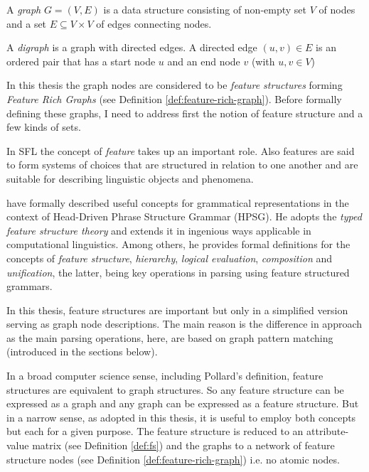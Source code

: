 \begin{definition}[Graph]\label{def:graph}
	A \textit{graph} $G=(V,E)$ is a data structure consisting of non-empty set $V$ of nodes and a set $E\subseteq V \times V$ of edges connecting nodes.
\end{definition}

\begin{definition}[Digraph]\label{def:digraph}
	A \textit{digraph} is a graph with directed edges. A directed edge $(u,v)\in E$ is an ordered pair that has a start node $u$ and an end node $v$ (with $u, v \in V$)
\end{definition}


In this thesis the graph nodes are considered to be \textit{feature structures} forming \textit{Feature Rich Graphs} (see Definition \ref{def:feature-rich-graph}). Before formally defining these graphs, I need to address first the notion of feature structure and a few kinds of sets. 

In SFL the concept of \textit{feature} takes up an important role. Also features are said to form systems of choices that are structured in relation to one another and are suitable for describing linguistic objects and phenomena.

\citet{Pollard1987} have formally described useful concepts for grammatical representations in the context of Head-Driven Phrase Structure Grammar (HPSG). He adopts the \textit{typed feature structure theory} and extends it in ingenious ways applicable in computational linguistics. Among others, he provides formal definitions for the concepts of \textit{feature structure}, \textit{hierarchy}, \textit{logical evaluation}, \textit{composition} and \textit{unification}, the latter, being key operations in parsing using feature structured grammars. 

In this thesis, feature structures are important but only in a simplified version serving as graph node descriptions. The main reason is the difference in approach as the main parsing operations, here, are based on graph pattern matching (introduced in the sections below).

In a broad computer science sense, including Pollard's definition, feature structures are equivalent to graph structures. So any feature structure can be expressed as a graph and any graph can be expressed as a feature structure. But in a narrow sense, as adopted in this thesis, it is useful to employ both concepts but each for a given purpose. The feature structure is reduced to an attribute-value matrix (see Definition \ref{def:fs}) and the graphs to a network of feature structure nodes (see Definition \ref{def:feature-rich-graph}) i.e. no atomic nodes.

